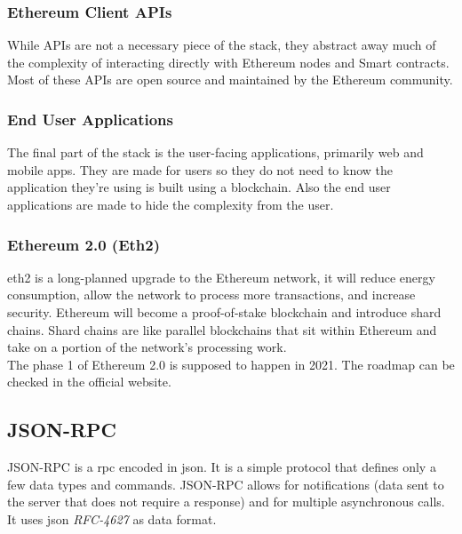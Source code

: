 \documentclass[a4paper, 12pt]{article} %
\begin{document}
        \subsubsection{Ethereum Client APIs}
            While APIs are not a necessary piece of the stack, they abstract away much of the complexity of interacting directly with Ethereum nodes and Smart contracts.\\
            
            Most of these APIs are open source and maintained by the Ethereum community.

        \subsubsection{End User Applications}
            The final part of the stack is the user-facing applications, primarily web and mobile apps.  They are made for users so they do not need to know the application they're using is built using a blockchain. Also the end user applications are made to hide the complexity from the user.
            
        \subsubsection{Ethereum 2.0 (Eth2)}
            \acrshort{eth2}\cite{eth2} is a long-planned upgrade to the Ethereum network, it will reduce energy consumption, allow the network to process more transactions, and increase security.  Ethereum will become a proof-of-stake blockchain and introduce shard chains. Shard chains are like parallel blockchains that sit within Ethereum and take on a portion of the network's processing work.\\
            
            The phase 1 of Ethereum 2.0 is supposed to happen in 2021. The roadmap can be checked in the official website\cite{eth2Roadmap}.
            

    \subsection{JSON-RPC}
        JSON-RPC is a \acrfull{rpc} encoded in \acrshort{json}. It is a simple protocol that defines only a few data types and commands. JSON-RPC allows for notifications (data sent to the server that does not require a response) and for multiple asynchronous calls. It uses \acrshort{json} \textit{RFC-4627}\cite{rfc4627} as data format.\\
        
\end{document}
